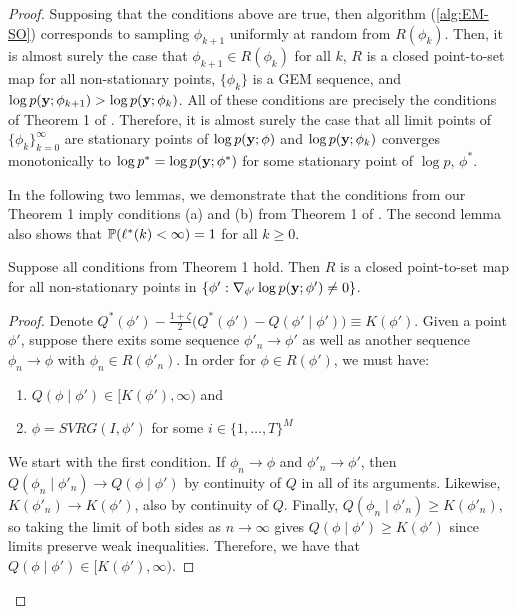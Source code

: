 \begin{proof}
Supposing that the conditions above are true, then algorithm (\ref{alg:EM-SO}) corresponds to sampling $\phi_{k+1}$ uniformly at random from $R(\phi_k)$. Then, it is almost surely the case that $\phi_{k+1} \in R(\phi_k)$ for all $k$, $R$ is a closed point-to-set map for all non-stationary points, $\{\phi_k\}$ is a GEM sequence, and $\log p(\mathbf{y};\phi_{k+1}) > \log p(\mathbf{y};\phi_k)$. All of these conditions are precisely the conditions of Theorem 1 of \citet{Wu:1983}. Therefore, it is almost surely the case that all limit points of $\{\phi_{k}\}_{k=0}^\infty$ are stationary points of $\log p(\mathbf{y};\phi)$ and $\log p(\mathbf{y};\phi_{k})$ converges monotonically to $\log p^* = \log p(\mathbf{y};\phi^*)$ for some stationary point of $\log p$, $\phi^*$. 

In the following two lemmas, we demonstrate that the conditions from our Theorem 1 imply conditions (a) and (b) from Theorem 1 of \citet{Wu:1983}. The second lemma also shows that $\mathbb{P}(\ell^*(k) < \infty) = 1$ for all $k \geq 0$.

\begin{lemma}
    Suppose all conditions from Theorem 1 hold. Then $R$ is a closed point-to-set map for all non-stationary points in $\{\phi' : \nabla_{\phi'} \log p(\mathbf{y} ; \phi') \neq 0\}$.
\end{lemma}

\begin{proof}
     Denote $Q^*(\phi') - \frac{1 + \zeta}{2} \Big( Q^*(\phi') - Q(\phi' \mid \phi') \Big) \equiv K(\phi')$. Given a point $\phi'$, suppose there exits some sequence $\phi'_{n} \to \phi'$ as well as another sequence $\phi_{n} \to \phi$ with $\phi_{n} \in R(\phi'_{n})$. In order for $\phi \in R(\phi')$, we must have:
    \begin{enumerate}
        \item $Q(\phi \mid \phi') \in [K(\phi'),\infty)$ and
        \item $\phi = SVRG(I,\phi')$ for some $i \in \{1,\ldots,T\}^M$
    \end{enumerate}
    We start with the first condition. If $\phi_{n} \to \phi$ and $\phi'_{n} \to \phi'$, then $Q(\phi_{n} \mid \phi'_{n}) \to Q(\phi \mid \phi')$ by continuity of $Q$ in all of its arguments. Likewise, $K(\phi'_{n}) \to K(\phi')$, also by continuity of $Q$. Finally, $Q(\phi_{n} \mid \phi'_{n}) \geq K(\phi'_{n})$, so taking the limit of both sides as $n \to \infty$ gives $Q(\phi \mid \phi') \geq K(\phi')$ since limits preserve weak inequalities. Therefore, we have that $Q(\phi \mid \phi') \in [K(\phi'),\infty)$.
    

\end{proof}
\end{proof}
